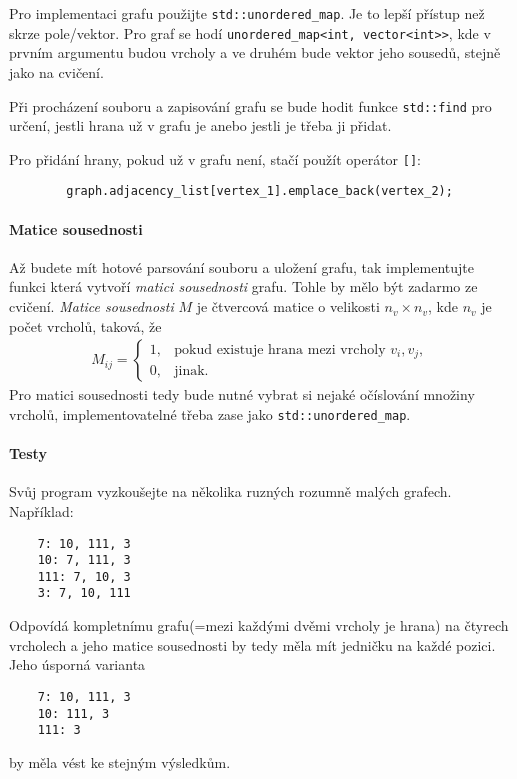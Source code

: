 \documentclass[12pt,oneside]{article}
\begin{document}
	Pro implementaci grafu použijte \verb|std::unordered_map|. Je to lepší přístup než skrze pole/vektor.
	Pro graf se hodí \verb|unordered_map<int, vector<int>>|, kde v prvním argumentu budou vrcholy a ve druhém bude vektor jeho sousedů, stejně jako na cvičení.
	
	Při procházení souboru a zapisování grafu se bude hodit funkce \verb*|std::find| pro určení, jestli hrana už v grafu je anebo jestli je třeba ji přidat.
	
	Pro přidání hrany, pokud už v grafu není, stačí použít operátor \verb*|[]|:
	\begin{verbatim}
		graph.adjacency_list[vertex_1].emplace_back(vertex_2);
	\end{verbatim}
	
	\paragraph{Matice sousednosti}
	Až budete mít hotové parsování souboru a uložení grafu, tak implementujte funkci která vytvoří \textit{matici sousednosti} grafu.
	Tohle by mělo být zadarmo ze cvičení.
	\textit{Matice sousednosti} $M$ je čtvercová matice o velikosti $n_v \times n_v$, kde $n_v$ je počet vrcholů, taková, že
	\begin{align}
		M_{ij} =  \begin{cases}
			1, & \text{pokud existuje hrana mezi vrcholy $v_i, v_j$}, \\
			0, & \text{jinak}.
		\end{cases}
	\end{align}
	Pro matici sousednosti tedy bude nutné vybrat si nejaké očíslování množiny vrcholů, implementovatelné třeba zase jako \verb|std::unordered_map|.
	
	
	\paragraph{Testy}
	Svůj program vyzkoušejte na několika ruzných rozumně malých grafech.
	Například:
	\begin{verbatim}
	7: 10, 111, 3
	10: 7, 111, 3
	111: 7, 10, 3
	3: 7, 10, 111
	\end{verbatim}
	Odpovídá kompletnímu grafu(=mezi každými dvěmi vrcholy je hrana) na čtyrech vrcholech a jeho matice sousednosti by tedy měla mít jedničku na každé pozici.
	Jeho úsporná varianta
	\begin{verbatim}
	7: 10, 111, 3
	10: 111, 3
	111: 3
	\end{verbatim}
	by měla vést ke stejným výsledkům.
	
\end{document}
